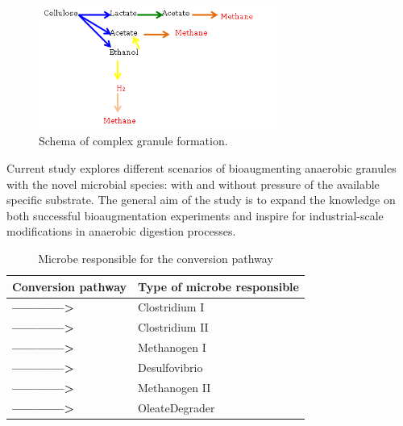 \begin{figure}[htbp]
\centering
\includegraphics[width=0.7\textwidth]{images/schema1.png}
\caption{Schema of complex granule formation.}
\label{fig:Schema of complex granule formation}
\end{figure}

Current study explores different scenarios of bioaugmenting anaerobic granules with the novel microbial species: with and without pressure of the available specific substrate. The general aim of the study is to expand the knowledge on both successful bioaugmentation experiments and inspire for industrial-scale modifications in anaerobic digestion processes. 

\begin{table}
\centering
\caption{Microbe responsible for the conversion pathway}
\label{table1}
\begin{tabular}{|l|l|}
\hline
Conversion pathway                                       & Type of microbe responsible \\ \hline
{\color[HTML]{00009B} \textbf{------------\textgreater}} & Clostridium I               \\ \hline
{\color[HTML]{32CB00} \textbf{------------\textgreater}} & Clostridium II              \\ \hline
{\color[HTML]{036400} \textbf{------------\textgreater}} & Methanogen I                \\ \hline
{\color[HTML]{FFC702} \textbf{------------\textgreater}} & Desulfovibrio               \\ \hline
{\color[HTML]{38FFF8} \textbf{------------\textgreater}} & Methanogen II               \\ \hline
{\color[HTML]{FE0000} \textbf{------------\textgreater}} & OleateDegrader              \\ \hline
\end{tabular}
\end{table}


